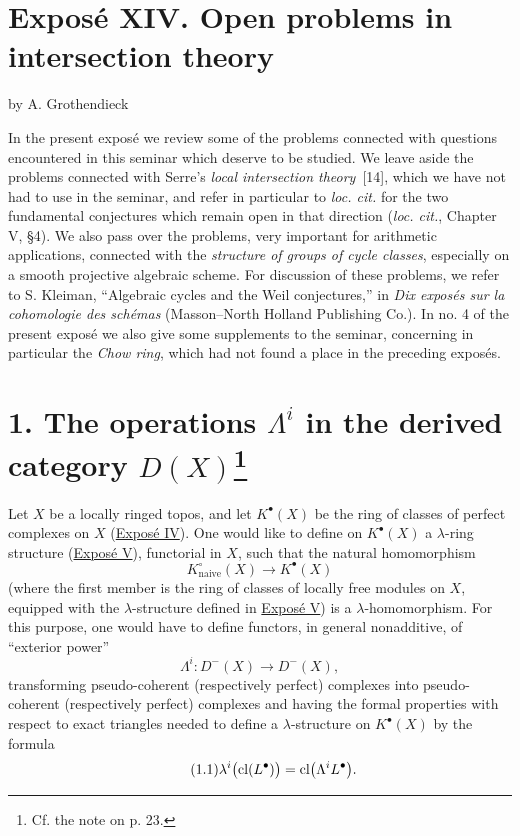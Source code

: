 \section*{Expos\'e XIV. Open problems in intersection theory}
\begin{center}
by A. Grothendieck
\end{center}

In the present expos\'e we review some of the problems connected with questions encountered in this seminar which deserve to be studied. We leave aside the problems connected with Serre's \emph{local intersection theory}~[14], which we have not had to use in the seminar, and refer in particular to \emph{loc. cit.} for the two fundamental conjectures which remain open in that direction (\emph{loc. cit.}, Chapter V, \S4). We also pass over the problems, very important for arithmetic applications, connected with the \emph{structure of groups of cycle classes}, especially on a smooth projective algebraic scheme. For discussion of these problems, we refer to S. Kleiman, ``Algebraic cycles and the Weil conjectures,'' in \emph{Dix expos\'es sur la cohomologie des sch\'emas} (Masson--North Holland Publishing Co.). In no. 4 of the present expos\'e we also give some supplements to the seminar, concerning in particular the \emph{Chow ring}, which had not found a place in the preceding expos\'es.

\section*{1. The operations $\Lambda^i$ in the derived category $D(X)$\footnote{Cf. the note on p. 23.}}

Let $X$ be a locally ringed topos, and let $K^\bullet(X)$ be the ring of classes of perfect complexes on $X$ (\hyperlink{sga6.e04.expose}{Expos\'e IV}). One would like to define on $K^\bullet(X)$ a $\lambda$-ring structure (\hyperlink{sga6.e05.expose}{Expos\'e V}), functorial in $X$, such that the natural homomorphism
\[
  K^\circ_{\mathrm{naive}}(X)\longrightarrow K^\bullet(X)
\]
(where the first member is the ring of classes of locally free modules on $X$, equipped with the $\lambda$-structure defined in \hyperlink{sga6.e05.expose}{Expos\'e V}) is a $\lambda$-homomorphism. For this purpose, one would have to define functors, in general nonadditive, of ``exterior power''
\[
  \Lambda^i:D^-(X)\longrightarrow D^-(X),
\]
transforming pseudo-coherent (respectively perfect) complexes into pseudo-coherent (respectively perfect) complexes and having the formal properties with respect to exact triangles needed to define a $\lambda$-structure on $K^\bullet(X)$ by the formula
\begin{equation}\tag{1.1}
  \lambda^i\bigl(\operatorname{cl}(L^\bullet)\bigr)
  =\operatorname{cl}\bigl(\Lambda^iL^\bullet\bigr).
\end{equation}

